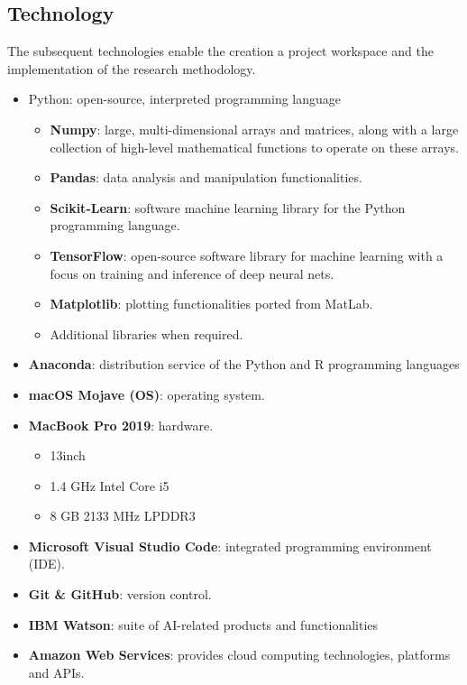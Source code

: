 \documentclass[12pt]{article}
\begin{document}
\subsection{Technology}\label{tech}
The subsequent technologies enable the creation a project workspace and the implementation of the research methodology.
\begin{itemize}
	\item Python: open-source, interpreted programming language
	\begin{itemize}
		\item \textbf{Numpy}: large, multi-dimensional arrays and matrices, along with a large collection of high-level mathematical functions to operate on these arrays.
		\item \textbf{Pandas}: data analysis and manipulation functionalities.
		\item \textbf{Scikit-Learn}: software machine learning library for the Python programming language.
		\item \textbf{TensorFlow}: open-source software library for machine learning with a focus on training and inference of deep neural nets.
		\item \textbf{Matplotlib}: plotting functionalities ported from MatLab.
		\item Additional libraries when required.
	\end{itemize}
	\item \textbf{Anaconda}: distribution service of the Python and R programming languages
	\item \textbf{macOS Mojave (OS)}: operating system.
	\item \textbf{MacBook Pro 2019}: hardware.
	\begin{itemize}
		\item 13inch
		\item 1.4 GHz Intel Core i5
		\item 8 GB 2133 MHz LPDDR3
	\end{itemize}
	\item \textbf{Microsoft Visual Studio Code}: integrated programming environment (IDE).
	\item \textbf{Git \& GitHub}: version control.
	\item \textbf{IBM Watson}: suite of AI-related products and functionalities
	\item \textbf{Amazon Web Services}: provides cloud computing technologies, platforms and APIs.
\end{itemize}
\end{document}
